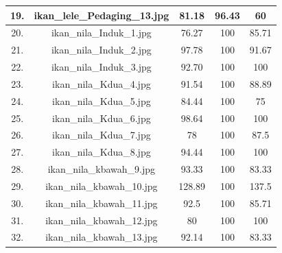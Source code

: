 \begin{longtable}{|c|c|c|c|c|}
        \hline
        19. & ikan\_lele\_Pedaging\_13.jpg & 81.18 & 96.43 & 60 \\
        \hline
        20. & ikan\_nila\_Induk\_1.jpg & 76.27 & 100 & 85.71 \\
        \hline
        21. & ikan\_nila\_Induk\_2.jpg & 97.78 & 100 & 91.67 \\
        \hline
        22. & ikan\_nila\_Induk\_3.jpg & 92.70 & 100 & 100 \\
        \hline
        23. & ikan\_nila\_Kdua\_4.jpg & 91.54 & 100 & 88.89 \\
        \hline
        24. & ikan\_nila\_Kdua\_5.jpg & 84.44 & 100 & 75 \\
        \hline
        25. & ikan\_nila\_Kdua\_6.jpg & 98.64 & 100 & 100 \\
        \hline
        26. & ikan\_nila\_Kdua\_7.jpg & 78 & 100 & 87.5 \\
        \hline
        27. & ikan\_nila\_Kdua\_8.jpg & 94.44 & 100 & 100 \\
        \hline
        28. & ikan\_nila\_kbawah\_9.jpg & 93.33 & 100 & 83.33 \\
        \hline
        29. & ikan\_nila\_kbawah\_10.jpg & 128.89 & 100 & 137.5 \\
        \hline
        30. & ikan\_nila\_kbawah\_11.jpg & 92.5 & 100 & 85.71 \\
        \hline
        31. & ikan\_nila\_kbawah\_12.jpg & 80 & 100 & 100 \\
        \hline
        32. & ikan\_nila\_kbawah\_13.jpg & 92.14 & 100 & 83.33 \\
        \hline
\end{longtable}